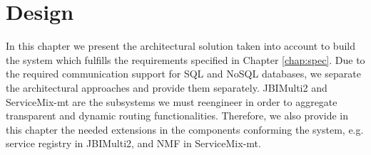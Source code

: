 \chapter{Design}
\label{chap:design}


In this chapter we present the architectural solution taken into account to build the system which fulfills the requirements specified in Chapter \ref{chap:spec}. Due to the required communication support for \ac{SQL} and \ac{NoSQL} databases, we separate the architectural approaches and provide them separately. JBIMulti2 and ServiceMix-mt are the subsystems we must reengineer in order to aggregate transparent and dynamic routing functionalities. Therefore, we also provide in this chapter the needed extensions in the components conforming the system, e.g. service registry in JBIMulti2, and \ac{NMF} in ServiceMix-mt.






\FloatBarrier